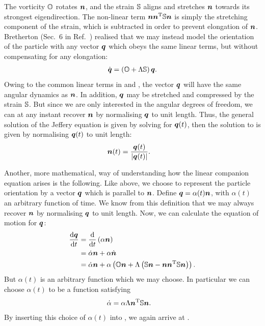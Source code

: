 \documentclass[thesis.tex]{subfiles}
\begin{document}
The vorticity $\mathbb{O}$ rotates $\mbox{\boldmath$n$}$, and the strain $\mathbb{S}$ aligns and stretches $\mbox{\boldmath$n$}$ towards its strongest eigendirection. The non-linear term $\mbox{\boldmath$n$} \mbox{\boldmath$n$}^{\mathrm T} \mathbb{S} \mbox{\boldmath$n$}$ is simply the stretching component of the strain, which is subtracted in order to prevent elongation of $\mbox{\boldmath$n$}$. Bretherton (Sec.~6 in Ref.~) realised that we may instead model the orientation of the particle with any vector $\mbox{\boldmath$q$}$ which obeys the same linear terms, but without compensating for any elongation:
\begin{align}
	\dot{\ve q} = \left(\ma O + \Lambda \ma S\right) \ve q.\eqnlab{jefferyq}
\end{align}
Owing to the common linear terms in  and , the vector $\mbox{\boldmath$q$}$ will have the same angular dynamics as $\mbox{\boldmath$n$}$. In addition, $\mbox{\boldmath$q$}$ may be stretched and compressed by the strain $\mathbb{S}$. But since we are only interested in the angular degrees of freedom, we can at any instant recover $\mbox{\boldmath$n$}$ by normalising $\mbox{\boldmath$q$}$ to unit length. Thus, the general solution of the Jeffery equation is given by solving  for $\mbox{\boldmath$q$}(t)$, then the solution to  is given by normalising $\mbox{\boldmath$q$}(t)$ to unit length:
\begin{align}
	\ve n(t) &= \frac{\ve q(t)}{|\ve q(t)|}.\eqnlab{jefferysolution0}
\end{align}

Another, more mathematical, way of understanding how the linear companion equation  arises is the following. Like above, we choose to represent the particle orientation by a vector $\mbox{\boldmath$q$}$ which is parallel to $\mbox{\boldmath$n$}$. Define $\mbox{\boldmath$q$} = \alpha(t)\mbox{\boldmath$n$}$, with $\alpha(t)$ an arbitrary function of time. We know from this definition that we may always recover $\mbox{\boldmath$n$}$ by normalising $\mbox{\boldmath$q$}$ to unit length. Now, we can calculate the equation of motion for $\mbox{\boldmath$q$}$:
\begin{align}
	\diff{\ve q}{t} &= \diff{}{t}\left(\alpha \ve n\right) \nn \\
	&= \dot \alpha \ve n + \alpha \dot{\ve n} \nn\\
	&= \dot \alpha \ve n + \alpha \left(\ma O \ve n + \Lambda \left(\ma S \ve n - \ve n \ve n \transpose \ma S \ve n\right)\right). \eqnlab{jefferyderivation1}
\end{align}
But $\alpha(t)$ is an arbitrary function which we may choose. In particular we can choose $\alpha(t)$ to be a function satisfying
\begin{align}
	\dot \alpha &= \alpha \Lambda \mbox{\boldmath$n$}^{\mathrm T} \mathbb{S} \mbox{\boldmath$n$}.
\end{align}
By inserting this choice of $\alpha(t)$ into , we again arrive at .
\end{document}
